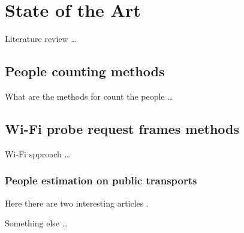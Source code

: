 \chapter{State of the Art}
\label{cha:soa}
\vspace{0.5 cm} 

Literature review \dots


\vspace{0.5 cm} 
\section{People counting methods}
\label{sec:count}
\vspace{0.5 cm} 

What are the methods for count the people \dots


\vspace{0.5 cm} 
\section{Wi-Fi probe request frames methods}
\label{sec:probe}
\vspace{0.5 cm}

Wi-Fi spproach \dots


\vspace{0.5 cm} 
\subsection{People estimation on public transports}
\label{sec:bus}
\vspace{0.5 cm}

Here there are two interesting articles
\cite{nishide2019filter} \cite{mikkelsen2016public}.


Something else \cite{mehmood2019occupancy} \dots
